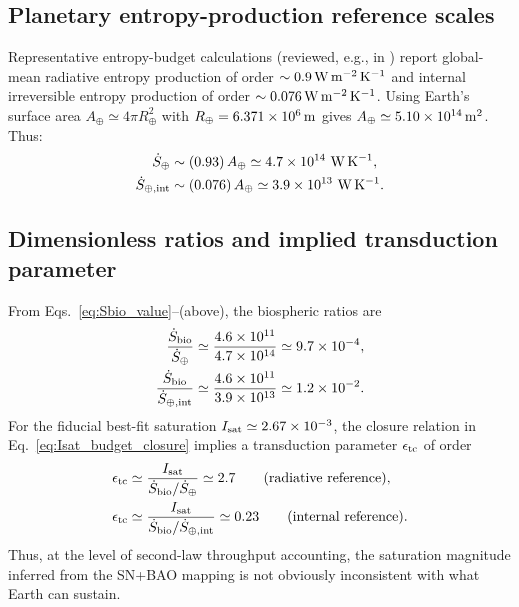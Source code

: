 \documentclass[10pt]{article}
\begin{document}
\subsection{Planetary entropy-production reference scales}

Representative entropy-budget calculations (reviewed, e.g., in \cite{Kleidon2010HierarchyMEP}) report
global-mean radiative entropy production of order
\(\sim 0.9\,{\rm W\,m^{-2}\,K^{-1}}\) and internal irreversible entropy production of order
\(\sim 0.076\,{\rm W\,m^{-2}\,K^{-1}}\).
Using Earth’s surface area \(A_\oplus \simeq 4\pi R_\oplus^2\) with
\(R_\oplus=6.371\times 10^6\,{\rm m}\) gives \(A_\oplus\simeq 5.10\times 10^{14}\,{\rm m^2}\). Thus:
\begin{align}
\dot S_{\oplus} &\sim (0.93)\,A_\oplus \simeq 4.7\times 10^{14}\ {\rm W\,K^{-1}},\\
\dot S_{\oplus,{\rm int}} &\sim (0.076)\,A_\oplus \simeq 3.9\times 10^{13}\ {\rm W\,K^{-1}}.
\end{align}

\subsection{Dimensionless ratios and implied transduction parameter}

From Eqs.~\eqref{eq:Sbio_value}--(above), the biospheric ratios are
\begin{align}
\frac{\dot S_{\rm bio}}{\dot S_{\oplus}}
&\simeq \frac{4.6\times 10^{11}}{4.7\times 10^{14}}
\simeq 9.7\times 10^{-4},\\
\frac{\dot S_{\rm bio}}{\dot S_{\oplus,{\rm int}}}
&\simeq \frac{4.6\times 10^{11}}{3.9\times 10^{13}}
\simeq 1.2\times 10^{-2}.
\end{align}
For the fiducial best-fit saturation \(I_{\rm sat}\simeq 2.67\times 10^{-3}\),
the closure relation in Eq.~\eqref{eq:Isat_budget_closure} implies a transduction parameter
\(\epsilon_{\rm tc}\) of order
\begin{align}
\epsilon_{\rm tc}
&\simeq \frac{I_{\rm sat}}{\dot S_{\rm bio}/\dot S_{\oplus}}
\simeq 2.7
\qquad (\text{radiative reference}),\\
\epsilon_{\rm tc}
&\simeq \frac{I_{\rm sat}}{\dot S_{\rm bio}/\dot S_{\oplus,{\rm int}}}
\simeq 0.23
\qquad (\text{internal reference}).
\end{align}
Thus, at the level of second-law throughput accounting, the saturation magnitude inferred from the
SN+BAO mapping is not obviously inconsistent with what Earth can sustain.
\end{document}
